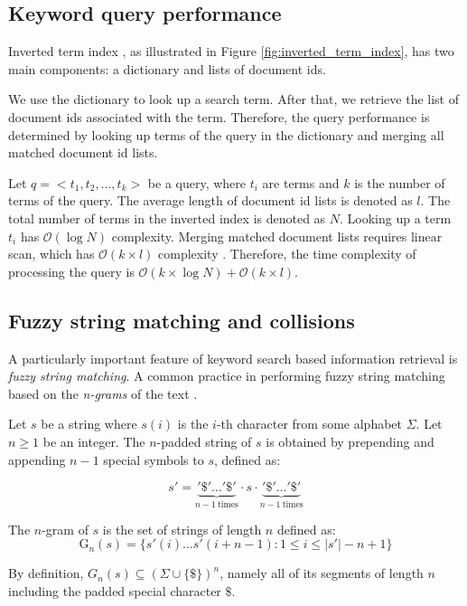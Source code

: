 \subsection{Keyword query performance}
Inverted term index \cite{putz1991using}, as illustrated in Figure \ref{fig:inverted_term_index}, has two main components: a dictionary and lists of document ids.

We use the dictionary to look up a search term. After that, we retrieve the list of document ids associated with the term. Therefore, the query performance is determined by looking up terms of the query in the dictionary and merging all matched document id lists.

Let $q = <t_1, t_2, \dots, t_k>$ be a query, where $t_i$ are terms and $k$ is the number of terms of the query. The average length of document id lists is denoted as $l$. The total number of terms in the inverted index is denoted as $N$. Looking up a term $t_i$ has $\mathcal{O}(\log N)$ complexity. Merging matched document lists requires linear scan, which has $\mathcal{O}(k \times l)$ complexity . Therefore, the time complexity of processing the query is $\mathcal{O}(k \times \log N) + \mathcal{O}(k \times l)$.

\subsection{Fuzzy string matching and collisions}
\label{sec:fuzzy-collision}
A particularly important feature of keyword search based information retrieval is {\em fuzzy string matching}.  A common practice in performing fuzzy string matching based on the {\em n-grams} of the text \cite{kim1994fast}.

\begin{definition}[n-grams]
Let $s$ be a string where $s(i)$ is the $i$-th character from some alphabet $\Sigma$.  Let $n\geq 1$ be an
integer.  The $n$-padded string of $s$ is obtained by prepending and appending $n-1$ special symbols to $s$, defined as:

$$
s' = \underbrace{\mathtt{'\$'}\dots \mathtt{'\$'}}_{n-1\ \mathrm{times}} \cdot s\cdot
\underbrace{\mathtt{'\$'}\dots \mathtt{'\$'}}_{n-1\ \mathrm{times}} 
$$

The $n$-gram of $s$ is the set of strings of length $n$ defined as:
$$
\mathrm{G}_n(s) = \{s'(i) \dots s'(i+n-1): 1\leq i\leq |s'|-n+1\}
$$
\end{definition}

By definition, $G_n(s)\subseteq(\Sigma\cup\{\$\})^n$, namely all of its segments of length $n$ including
the padded special character $\$$.

